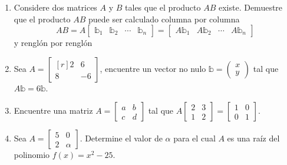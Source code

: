 \begin{enumerate}[start=35]
    \item Considere dos matrices $A$ y $B$ tales que el producto $AB$ existe. Demuestre que el producto $AB$ puede ser calculado columna por columna
    $$AB = A\begin{bmatrix}
        \mathbb{b}_1 & \mathbb{b}_2 & \cdots & \mathbb{b}_n
    \end{bmatrix} = \begin{bmatrix}
        A\mathbb{b}_1 & A\mathbb{b}_2 & \cdots & A\mathbb{b}_n
    \end{bmatrix}$$
    y renglón por renglón
    \begin{matrizn}
    \end{matrizn}
    \item Sea $A=\begin{bmatrix*}[r]2 & 6 \\ 8 & -6\end{bmatrix*}$, encuentre un vector no nulo $\mathbb{b} = \begin{pmatrix*}x \\ y\end{pmatrix*}$ tal que $A\mathbb{b} = 6\mathbb{b}$.
    \item Encuentre una matriz $A=\begin{bmatrix*}a & b \\ c & d\end{bmatrix*}$ tal que $A\begin{bmatrix*}2 & 3 \\ 1 & 2\end{bmatrix*}=\begin{bmatrix*}1 & 0 \\ 0 & 1\end{bmatrix*}$.
    \item Sea $A=\begin{bmatrix*}5 & 0 \\ 2 & \alpha\end{bmatrix*}$. Determine el valor de $\alpha$ para el cual $A$ es una raíz del polinomio $f(x)=x^{2}-25$.

\end{enumerate}
